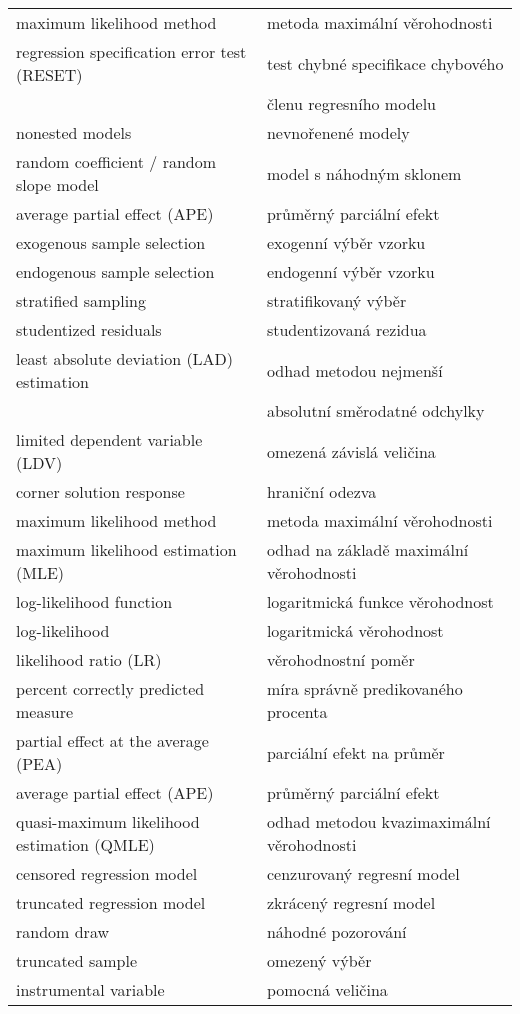 \begin{table}
\begin{center}
\begin{tabular}{l l}
maximum likelihood method & metoda maximální věrohodnosti\\
regression specification error test (RESET) & test chybné specifikace chybového\\
 & členu regresního modelu\\
nonested models & nevnořenené modely\\
random coefficient / random slope model & model s náhodným sklonem\\
average partial effect (APE) & průměrný parciální efekt\\
exogenous sample selection & exogenní výběr vzorku\\
endogenous sample selection & endogenní výběr vzorku\\
stratified sampling & stratifikovaný výběr\\
studentized residuals & studentizovaná rezidua\\
least absolute deviation (LAD) estimation & odhad metodou nejmenší\\
 & absolutní směrodatné odchylky\\ 
limited dependent variable (LDV) & omezená závislá veličina\\
corner solution response & hraniční odezva\\
maximum likelihood method & metoda maximální věrohodnosti\\
maximum likelihood estimation (MLE) & odhad na základě maximální věrohodnosti\\
log-likelihood function & logaritmická funkce věrohodnost\\
log-likelihood & logaritmická věrohodnost\\
likelihood ratio (LR) & věrohodnostní poměr\\
percent correctly predicted measure & míra správně predikovaného procenta\\
partial effect at the average (PEA) & parciální efekt na průměr\\
average partial effect (APE) & průměrný parciální efekt\\
quasi-maximum likelihood estimation (QMLE) & odhad metodou kvazimaximální věrohodnosti\\
censored regression model & cenzurovaný regresní model\\
truncated regression model & zkrácený regresní model\\
random draw & náhodné pozorování\\
truncated sample & omezený výběr\\
instrumental variable & pomocná veličina\\

\end{tabular}
\end{center}
\end{table}
